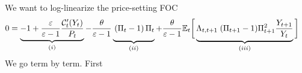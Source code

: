 \documentclass[12pt]{article}
\theoremstyle{plain}
\theoremstyle{definition}
\theoremstyle{remark}
\newcommand{\calC}{\mathcal{C}}
\newcommand{\E}{\mathbb{E}}
\begin{document}
    We want to log-linearize the price-setting FOC
    \begin{align*}
      0 &=
      \underbrace{%
        -1 + \frac{\varepsilon}{\varepsilon-1}
        \frac{\calC'_t(Y_t)}{P_t}
      }_{(i)}
      -
      \frac{\theta}{\varepsilon-1}
      \underbrace{%
        \vphantom{%
          -1 + \frac{\varepsilon}{(\varepsilon-1)(1-\alpha)} M_t
            Y_t^{\frac{\alpha}{1-\alpha}}
        }
        \left(
        \Pi_t-1
        \right)
        \Pi_t
      }_{(ii)}
      +
      \frac{\theta}{\varepsilon-1}
      \E_t\bigg[
      \underbrace{%
        \vphantom{%
          -1 + \frac{\varepsilon}{(\varepsilon-1)(1-\alpha)} M_t
            Y_t^{\frac{\alpha}{1-\alpha}}
        }
        \Lambda_{t,t+1}\;
        (\Pi_{t+1}-1)\Pi^2_{t+1}\frac{Y_{t+1}}{Y_t}
      }_{(iii)}
      \bigg]
    \end{align*}
    We go term by term. First
\end{document}
